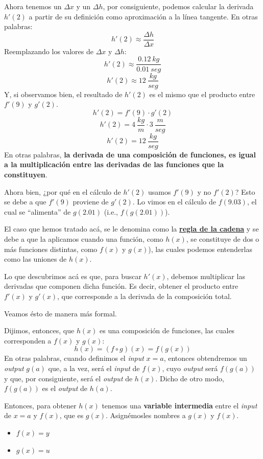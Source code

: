 \documentclass[12pt]{article}
\begin{document}
Ahora tenemos un $\Delta x$ y un $\Delta h$, por consiguiente, podemos calcular la derivada $h'(2)$ a partir de su definición como aproximación a la línea tangente. En otras palabras:
\[h'(2) \approx \frac{\Delta h}{\Delta x}\]
Reemplazando los valores de $\Delta x$ y $\Delta h$:
\[h'(2) \approx \frac{0.12 \ kg}{0.01 \ seg}\]
\[h'(2) \approx 12 \ \frac{kg}{seg}\]
Y, si observamos bien, el resultado de $h'(2)$ es el mismo que el producto entre $f'(9)$ y $g'(2)$. 
\[h'(2) = f'(9) \cdot g'(2)\]
\[h'(2) = 4 \ \frac{kg}{m} \cdot 3 \ \frac{m}{seg}\]
\[h'(2) = 12 \ \frac{kg}{seg}\]
En otras palabras, \textbf{la derivada de una composición de funciones, es igual a la multiplicación entre las derivadas de las funciones que la constituyen}.

Ahora bien, ¿por qué en el cálculo de $h'(2)$ usamos $f'(9)$ y no $f'(2)$? Esto se debe a que $f'(9)$ proviene de $g'(2)$. Lo vimos en el cálculo de $f(9.03)$, el cual se ``alimenta'' de $g(2.01)$ (i.e., $f(g(2.01))$).

El caso que hemos tratado acá, se le denomina como la \underline{\textbf{regla de la cadena}} y se debe a que la aplicamos cuando una función, como $h(x)$, se constituye de dos o más funciones distintas, como $f(x)$ y $g(x)$), las cuales podemos entenderlas como las uniones de $h(x)$.

Lo que descubrimos acá es que, para buscar $h'(x)$, debemos multiplicar las derivadas que componen dicha función. Es decir, obtener el producto entre $f'(x)$ y $g'(x)$, que corresponde a la derivada de la composición total.

Veamos ésto de manera más formal.

Dijimos, entonces, que $h(x)$ es una composición de funciones, las cuales corresponden a $f(x)$ y $g(x)$:
\[h(x) = (f \circ g)(x) = f(g(x))\]
En otras palabras, cuando definimos el \textit{input} $x = a$, entonces obtendremos un \textit{output} $g(a)$ que, a la vez, será el \textit{input} de $f(x)$, cuyo \textit{output} será $f(g(a))$ y que, por consiguiente, será el \textit{output} de $h(x)$. Dicho de otro modo, $f(g(a))$ es el \textit{output} de $h(a)$.

Entonces, para obtener $h(x)$ tenemos una \textbf{variable intermedia} entre el \textit{input} de $x = a$ y $f(x)$, que es $g(x)$. Asignémosles nombres a $g(x)$ y $f(x)$.

\newpage

\begin{itemize}
\item $f(x) = y$
\item $g(x) = u$
\end{itemize}
\end{document}
